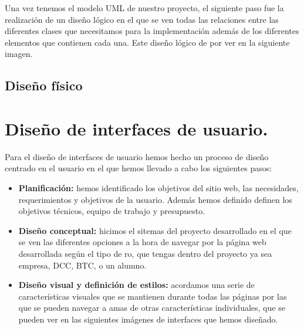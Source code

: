 \documentclass[pdftex,11pt,a4paper]{book}
\begin{document}
Una vez tenemos el modelo UML de nuestro proyecto, el siguiente paso fue la
realización de un diseño lógico en el que se ven todas las relaciones entre las diferentes clases que necesitamos para la implementación además de los diferentes elementos que contienen cada una. Este diseño lógico de por ver en la siguiente imagen.

\section{Diseño físico}





\chapter{Diseño de interfaces de usuario.}

Para el diseño de interfaces de usuario hemos hecho un proceso de diseño centrado en el usuario en el que hemos llevado a cabo los siguientes pasos:
\begin{itemize}
\item \textbf{Planificación:} hemos identificado los objetivos del sitio web, las necesidades, requerimientos y objetivos de la usuario. Además hemos definido definen los objetivos técnicos, equipo de trabajo y presupuesto.

\item \textbf{Diseño conceptual:} hicimos el sitemas del proyecto desarrollado en el que se ven las diferentes opciones a la hora de navegar por la página web desarrollada según el tipo de ro, que tengas dentro del proyecto ya sea empresa, DCC, BTC, o un alumno.

\item \textbf{Diseño visual y definición de estilos:} acordamos una serie de características visuales que se mantienen durante todas las páginas por las que se pueden navegar a amas de otras características individuales, que se pueden ver en las siguientes imágenes de interfaces que hemos diseñado.

\end{itemize}
\end{document}

